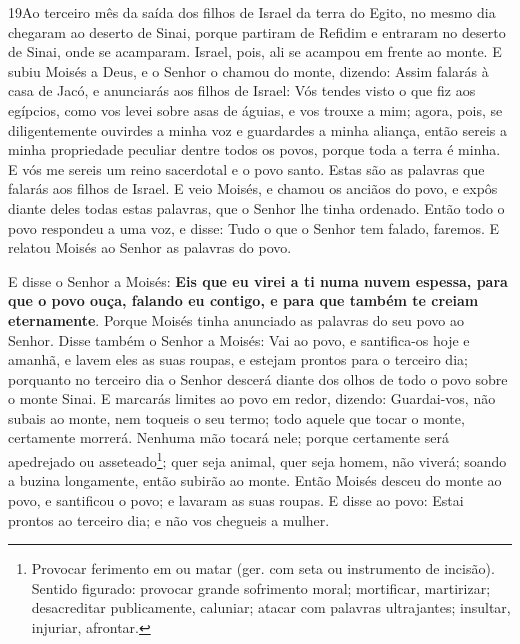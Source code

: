 \medskip

\lettrine{19} Ao terceiro mês da saída dos filhos de Israel da
terra do Egito, no mesmo dia chegaram ao deserto de Sinai,
porque partiram de Refidim e entraram no deserto de Sinai, onde
se acamparam. Israel, pois, ali se acampou em frente ao monte. E
subiu Moisés a Deus, e o Senhor o chamou do monte, dizendo: Assim
falarás à casa de Jacó, e anunciarás aos filhos de Israel: Vós
tendes visto o que fiz aos egípcios, como vos levei sobre asas de
águias, e vos trouxe a mim; agora, pois, se diligentemente
ouvirdes a minha voz e guardardes a minha aliança, então sereis a
minha propriedade peculiar dentre todos os povos, porque toda a
terra é minha. E vós me sereis um reino sacerdotal e o povo
santo. Estas são as palavras que falarás aos filhos de Israel. E
veio Moisés, e chamou os anciãos do povo, e expôs diante deles todas
estas palavras, que o Senhor lhe tinha ordenado. Então todo o
povo respondeu a uma voz, e disse: Tudo o que o Senhor tem falado,
faremos. E relatou Moisés ao Senhor as palavras do povo.

E disse o Senhor a Moisés: \textbf{Eis que eu virei a ti numa
nuvem espessa, para que o povo ouça, falando eu contigo, e para que
também te creiam eternamente}. Porque Moisés tinha anunciado as
palavras do seu povo ao Senhor. Disse também o Senhor a
Moisés: Vai ao povo, e santifica-os hoje e amanhã, e lavem eles as
suas roupas, e estejam prontos para o terceiro dia; porquanto
no terceiro dia o Senhor descerá diante dos olhos de todo o povo
sobre o monte Sinai. E marcarás limites ao povo em redor,
dizendo: Guardai-vos, não subais ao monte, nem toqueis o seu termo;
todo aquele que tocar o monte, certamente morrerá. Nenhuma
mão tocará nele; porque certamente será apedrejado ou
asseteado\footnote{Provocar ferimento em ou matar (ger. com seta ou
instrumento de incisão). Sentido figurado: provocar grande
sofrimento moral; mortificar, martirizar; desacreditar publicamente,
caluniar; atacar com palavras ultrajantes; insultar, injuriar,
afrontar.}; quer seja animal, quer seja homem, não viverá; soando a
buzina longamente, então subirão ao monte. Então Moisés
desceu do monte ao povo, e santificou o povo; e lavaram as suas
roupas. E disse ao povo: Estai prontos ao terceiro dia; e não
vos chegueis a mulher.


